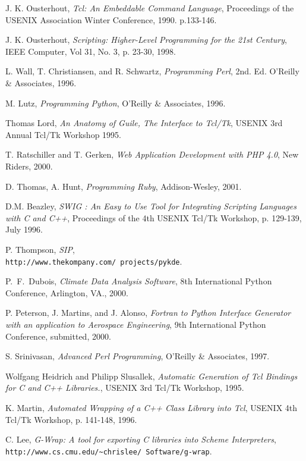 \begin{thebibliography}{99}


 J. K. Ousterhout, {\em Tcl: An Embeddable Command Language},
Proceedings of the USENIX Association Winter Conference, 1990. p.133-146.

 J. K. Ousterhout, {\em Scripting: Higher-Level Programming for the 21st Century},
IEEE Computer, Vol 31, No. 3, p. 23-30, 1998.

 L. Wall, T. Christiansen, and R. Schwartz, {\em Programming Perl}, 2nd. Ed.
O'Reilly \& Associates, 1996.

 M. Lutz, {\em Programming Python}, O'Reilly \& Associates, 1996.

 Thomas Lord, {\em An Anatomy of Guile, The Interface to 
Tcl/Tk}, USENIX 3rd Annual Tcl/Tk Workshop 1995.

 T. Ratschiller and T. Gerken, {\em Web Application Development with PHP 4.0},
New Riders, 2000.

 D. Thomas, A. Hunt, {\em Programming Ruby}, Addison-Wesley, 2001.

 D.M. Beazley, {\em SWIG : An Easy to Use Tool for Integrating Scripting Languages with C and C++}, Proceedings of the 4th USENIX Tcl/Tk Workshop, p. 129-139, July 1996. 

 P. Thompson, {\em SIP},\\
{\tt http://www.thekompany.com/ projects/pykde}.

 P.~F.~Dubois, {\em Climate Data Analysis Software}, 8th International Python Conference,
Arlington, VA., 2000.

 P. Peterson, J. Martins, and J. Alonso,
{\em Fortran to Python Interface Generator with an application to Aerospace
Engineering}, 9th International Python Conference, submitted, 2000.

 S. Srinivasan, {\em Advanced Perl Programming}, O'Reilly \& Associates, 1997.

 Wolfgang Heidrich and Philipp Slusallek, {\em Automatic Generation of Tcl Bindings for C and C++ Libraries.},
USENIX 3rd Tcl/Tk Workshop, 1995.

 K. Martin, {\em Automated Wrapping of a C++ Class Library into Tcl},
USENIX 4th Tcl/Tk Workshop, p. 141-148, 1996. 

 C. Lee, {\em G-Wrap: A tool for exporting C libraries into Scheme Interpreters},\\
{\tt http://www.cs.cmu.edu/\~{ }chrislee/
Software/g-wrap}.


\end{thebibliography}
